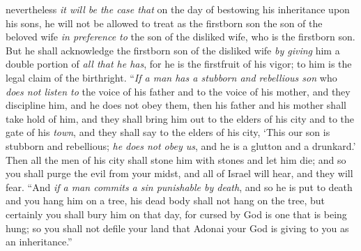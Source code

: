 \begin{biblechapter}
\verse nevertheless \textit{it will be the case that} on the day of bestowing his inheritance upon his sons, he will not be allowed to treat as the firstborn son the son of the beloved wife \textit{in preference to} the son of the disliked wife, who is the firstborn son.
\verse But he shall acknowledge the firstborn son of the disliked wife \textit{by giving} him a double portion of \textit{all that he has}, for he is the firstfruit of his vigor; to him is the legal claim of the birthright.
\verse “\textit{If a man has a stubborn and rebellious son} who \textit{does not listen to} the voice of his father and to the voice of his mother, and they discipline him, and he does not obey them,
\verse then his father and his mother shall take hold of him, and they shall bring him out to the elders of his city and to the gate of his \textit{town},
\verse and they shall say to the elders of his city, ‘This our son is stubborn and rebellious; \textit{he does not obey us}, and he is a glutton and a drunkard.’
\verse Then all the men of his city shall stone him with stones and let him die; and so you shall purge the evil from your midst, and all of Israel will hear, and they will fear.
\verse “And \textit{if a man commits a sin punishable by death}, and so he is put to death and you hang him on a tree,
\verse his dead body shall not hang on the tree, but certainly you shall bury him on that day, for cursed by God is one that is being hung; so you shall not defile your land that Adonai your God is giving to you as an inheritance.”
\end{biblechapter}

